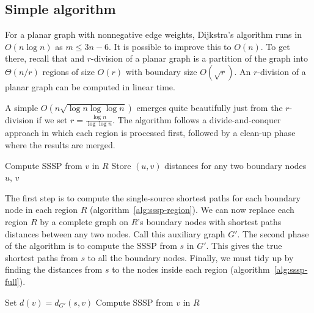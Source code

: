 \documentclass[12pt]{article}
\begin{document}
\subsection{Simple algorithm}
\label{sec:simple-algorithm}

For a planar graph with nonnegative edge weights, Dijkstra's algorithm runs in $O(n \log n)$ as $m \leq 3n - 6$. It is possible to improve this to $O(n)$. To get there, recall that and $r$-division of a planar graph is a partition of the graph into $\Theta(n/r)$ regions of size $O(r)$ with boundary size $O(\sqrt{r})$. An $r$-division of a planar graph can be computed in linear time.

A simple $O(n\sqrt{\log n \log \log n})$ emerges quite beautifully just from the $r$-division if we set $r = \frac{\log n}{\log \log n}$. The algorithm follows a divide-and-conquer approach in which each region is processed first, followed by a clean-up phase where the results are merged.

\begin{algorithm}[!htb]
  \label{alg:sssp-region}
  \begin{algorithmic}
        \State Compute SSSP from $v$ in $R$
        \State Store $(u,v)$ distances for any two boundary nodes $u$, $v$
      \EndFor
    \EndFor
  \end{algorithmic}
\end{algorithm}

The first step is to compute the single-source shortest paths for each boundary node in each region $R$ (algorithm~\ref{alg:sssp-region}). We can now replace each region $R$ by a complete graph on $R$'s boundary nodes with shortest paths distances between any two nodes. Call this auxiliary graph $G'$. The second phase of the algorithm is to compute the SSSP from $s$ in $G'$. This gives the true shortest paths from $s$ to all the boundary nodes. Finally, we must tidy up by finding the distances from $s$ to the nodes inside each region (algorithm~\ref{alg:sssp-full}).

\begin{algorithm}[!htb]
  \label{alg:sssp-full}
  \begin{algorithmic}
        \State Set $d(v) = d_{G'}(s,v)$
        \State Compute SSSP from $v$ in $R$
      \EndFor
    \EndFor
  \end{algorithmic}
\end{algorithm}
\end{document}
